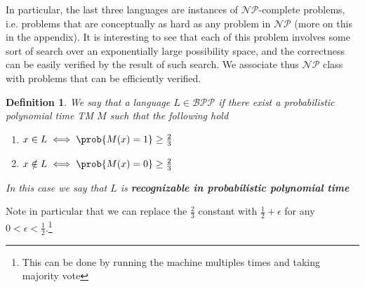 \documentclass{article}
\newtheorem{definition}{Definition}
\begin{document}
In particular, the last three languages are instances of $\mathcal{NP}$-complete problems, i.e. problems that are conceptually as hard as any problem in $\mathcal{NP}$ (more on this in the appendix). It is interesting to see that each of this problem involves some sort of search over an exponentially large possibility space, and the correctness can be easily verified by the result of such search. We associate thus $\mathcal{NP}$ class with problems that can be efficiently verified.

\begin{definition}
We say that a language $L \in \mathcal{BPP}$ if there exist a probabilistic polynomial time TM $M$ such that the following hold
\begin{enumerate}
    \item $x \in L \iff \prob{M(x) = 1} \geq \frac{2}{3}$
    \item $x \notin L \iff \prob{M(x) = 0} \geq \frac{2}{3}$
\end{enumerate}
In this case we say that $L$ is \textbf{recognizable in probabilistic polynomial time}
\end{definition}

Note in particular that we can replace the $\frac{2}{3}$ constant with $\frac{1}{2} + \epsilon$ for any $0 < \epsilon < \frac{1}{2}.$\footnote{This can be done by running the machine multiples times and taking majority vote}
\end{document}
